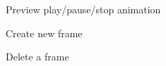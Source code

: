 \documentclass[11pt]{article} %
\begin{document}
{\begin{figure}[H]
	\centering
	\caption{Preview play/pause/stop animation}
	\label{fig:UC8}
\end{figure}

\begin{figure}[H]
	\centering
	\caption{Create new frame}
	\label{fig:UC9}
\end{figure}

\begin{figure}[H]
	\centering
	\caption{Delete a frame}
	\label{fig:UC10}
\end{figure}

}
\end{document}
